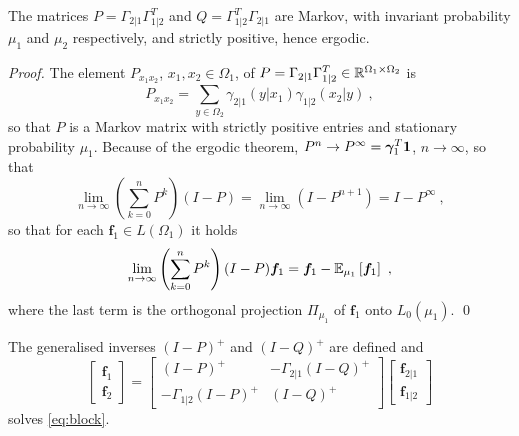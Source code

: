 \documentclass[runningheads]{llncs}
\begin{document}
\begin{proposition}The matrices $P = \Gamma_{2|1}\Gamma_{1|2}^T$ and $Q = \Gamma_{1|2}^T\Gamma_{2|1}$ are Markov, with invariant probability $\mu_1$ and $\mu_2$ respectively, and strictly positive, hence ergodic.
\end{proposition}

\begin{proof}The element $P_{x_1x_2}$, $x_1,x_2 \in \Omega_1$, of $P = \Gamma_{2|1}\Gamma_{1|2}^T \in \mathbb R^{\Omega_1 \times \Omega_2}$ is
%
\begin{equation*}
  P_{x_1x_2} = \sum_{y \in \Omega_2} \gamma_{2|1}(y|x_1) \gamma_{1|2}(x_2|y) \ ,
\end{equation*}
%
so that $P$ is a Markov matrix with strictly positive entries and stationary probability $\mu_1$. Because of the ergodic theorem, $P^n \to P^\infty = {\bm \gamma}_1^T \bm 1$, $n \to \infty$, so that 
%
\begin{equation*}
\lim_{n\to\infty} \left(\sum_{k=0}^n P^k\right)(I-P) = \lim_{n\to\infty} \left(I - P^{n+1}\right) = I - P^\infty \ , 
\end{equation*}
%
so that for each $\bm f_1 \in L(\Omega_1)$ it holds
%
\begin{equation*}
  \lim_{n\to\infty} \left(\sum_{k=0}^n P^k\right)(I-P) \bm f_1 = \bm f_1 - {\operatorname{\mathbb E}}_{\mu_1}\left[\bm f_1\right] \ ,
\end{equation*}
%
where the last term is the orthogonal projection $\Pi_{\mu_1}$ of $\bm f_1$ onto $L_0(\mu_1)$. \qed
\end{proof}

\begin{proposition}The generalised inverses $(I-P)^+$ and $(I-Q)^+$ are defined and 
%
  \begin{equation*}
  \begin{bmatrix}
    \bm f_1 \\ \bm f_2
  \end{bmatrix}
=
    \begin{bmatrix}
      (I - P)^+ & - \Gamma_{2|1}(I - Q)^+ \\
- \Gamma_{1|2}(I-P)^+ & (I-Q)^+
    \end{bmatrix}
    \begin{bmatrix}
      \bm f_{2|1} \\ \bm f_{1|2}
    \end{bmatrix}
  \end{equation*}
%
solves \cref{eq:block}.
\end{proposition}
\end{document}
